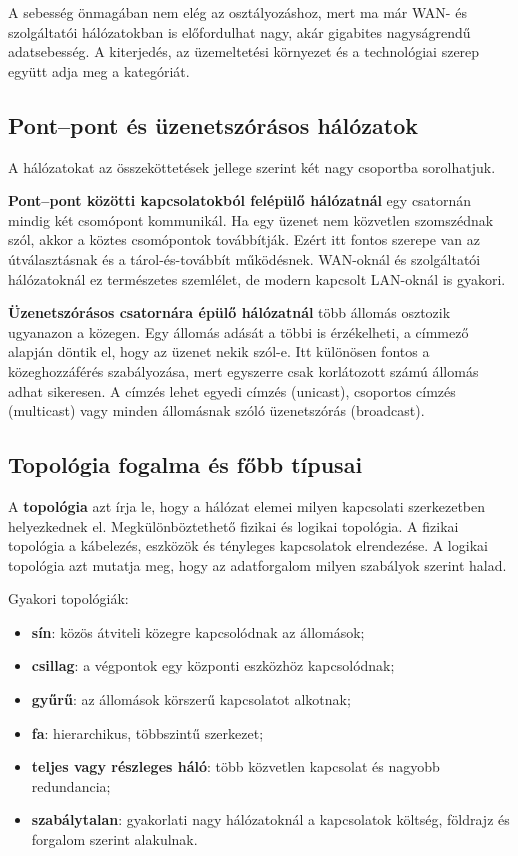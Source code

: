 A sebesség önmagában nem elég az osztályozáshoz, mert ma már WAN- és szolgáltatói hálózatokban is előfordulhat nagy, akár gigabites nagyságrendű adatsebesség. A kiterjedés, az üzemeltetési környezet és a technológiai szerep együtt adja meg a kategóriát.

\subsection{Pont--pont és üzenetszórásos hálózatok}

A hálózatokat az összeköttetések jellege szerint két nagy csoportba sorolhatjuk.

\textbf{Pont--pont közötti kapcsolatokból felépülő hálózatnál} egy csatornán mindig két csomópont kommunikál. Ha egy üzenet nem közvetlen szomszédnak szól, akkor a köztes csomópontok továbbítják. Ezért itt fontos szerepe van az útválasztásnak és a tárol-és-továbbít működésnek. WAN-oknál és szolgáltatói hálózatoknál ez természetes szemlélet, de modern kapcsolt LAN-oknál is gyakori.

\textbf{Üzenetszórásos csatornára épülő hálózatnál} több állomás osztozik ugyanazon a közegen. Egy állomás adását a többi is érzékelheti, a címmező alapján döntik el, hogy az üzenet nekik szól-e. Itt különösen fontos a közeghozzáférés szabályozása, mert egyszerre csak korlátozott számú állomás adhat sikeresen. A címzés lehet egyedi címzés (unicast), csoportos címzés (multicast) vagy minden állomásnak szóló üzenetszórás (broadcast).

\subsection{Topológia fogalma és főbb típusai}

A \textbf{topológia} azt írja le, hogy a hálózat elemei milyen kapcsolati szerkezetben helyezkednek el. Megkülönböztethető fizikai és logikai topológia. A fizikai topológia a kábelezés, eszközök és tényleges kapcsolatok elrendezése. A logikai topológia azt mutatja meg, hogy az adatforgalom milyen szabályok szerint halad.

Gyakori topológiák:

\begin{itemize}
  \item \textbf{sín}: közös átviteli közegre kapcsolódnak az állomások;
  \item \textbf{csillag}: a végpontok egy központi eszközhöz kapcsolódnak;
  \item \textbf{gyűrű}: az állomások körszerű kapcsolatot alkotnak;
  \item \textbf{fa}: hierarchikus, többszintű szerkezet;
  \item \textbf{teljes vagy részleges háló}: több közvetlen kapcsolat és nagyobb redundancia;
  \item \textbf{szabálytalan}: gyakorlati nagy hálózatoknál a kapcsolatok költség, földrajz és forgalom szerint alakulnak.
\end{itemize}


